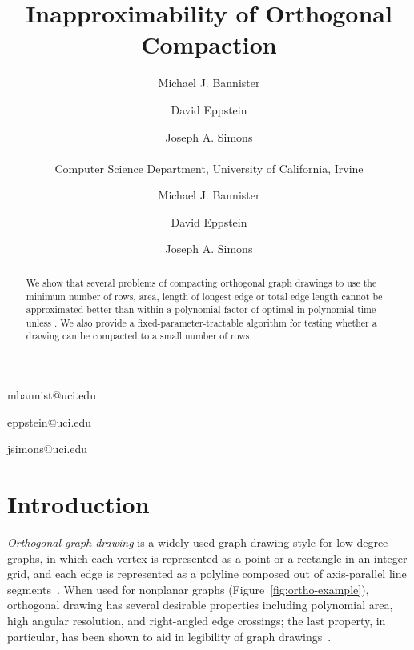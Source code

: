 \documentclass[12pt]{article}
\theoremstyle{definitions}
\begin{document}
\title{Inapproximability of Orthogonal Compaction}

\ifFull
\author{Michael J. Bannister \and David Eppstein \and Joseph A. Simons \\ \\
Computer Science Department, University of California, Irvine}
\else
{}   


\author{Michael J. Bannister}{mbannist@uci.edu}
\author{David Eppstein}{eppstein@uci.edu}
\author{Joseph A. Simons}{jsimons@uci.edu}


\submitted{}\reviewed{}\revised{}\reviewed{}\revised{}\accepted{}\final{}\published{}\editor{}\fi

\maketitle

\begin{abstract}
We show that several problems of compacting orthogonal graph drawings to use the minimum number of rows, area, length of longest edge or total edge length cannot be approximated better than  within a polynomial factor of optimal in polynomial time unless . We also provide a fixed-parameter-tractable algorithm for testing whether a drawing can be compacted to a small number of rows.
\end{abstract}

\ifFull
\else
\Body \fi

\section{Introduction}
\emph{Orthogonal graph drawing} is a widely used graph drawing style for low-degree graphs, in which each vertex is represented as a point or a rectangle in an integer grid, and each edge is represented as a polyline composed out of axis-parallel line segments~\cite{Eiglsperger:2001}. When used for nonplanar graphs (Figure~\ref{fig:ortho-example}),
orthogonal drawing has several desirable properties including polynomial area, high angular resolution, and right-angled edge crossings; the last property, in particular, has been shown to aid in legibility of graph drawings~\cite{HuaHonEad-PacVis-08}.
\end{document}
